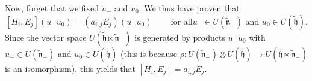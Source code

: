 \documentclass[etingof-lie.tex]{subfiles}
\begin{document}
\begin{vershort}
Now, forget that we fixed $u_{-}$ and $u_{0}$. We thus have proven that%
\[
\left[  H_{i},E_{j}\right]  \left(  u_{-}u_{0}\right)  =\left(  a_{i,j}%
E_{j}\right)  \left(  u_{-}u_{0}\right)  \ \ \ \ \ \ \ \ \ \ \text{for all
}u_{-}\in U\left(  \widetilde{\mathfrak{n}}_{-}\right)  \text{ and }u_{0}\in
U\left(  \widetilde{\mathfrak{h}}\right)  .
\]
Since the vector space $U\left(  \widetilde{\mathfrak{h}}\ltimes
\widetilde{\mathfrak{n}}_{-}\right)  $ is generated by products $u_{-}u_{0}$
with $u_{-}\in U\left(  \widetilde{\mathfrak{n}}_{-}\right)  $ and $u_{0}\in
U\left(  \widetilde{\mathfrak{h}}\right)  $ (this is because $\rho:U\left(
\widetilde{\mathfrak{n}}_{-}\right)  \otimes U\left(  \widetilde{\mathfrak{h}%
}\right)  \rightarrow U\left(  \widetilde{\mathfrak{h}}\ltimes
\widetilde{\mathfrak{n}}_{-}\right)  $ is an isomorphism), this yields that
$\left[  H_{i},E_{j}\right]  =a_{i,j}E_{j}$.
\end{vershort}
\end{document}
